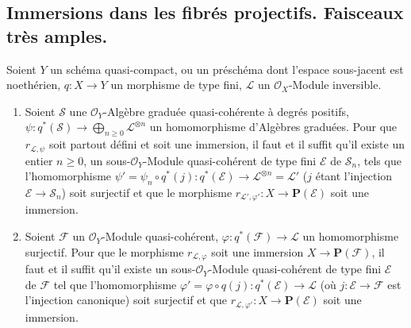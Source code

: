 \subsection{Immersions dans les fibrés projectifs. Faisceaux très amples.}
\label{subsection:II.4.4-fr}

\begin{proposition}[4.4.1]
\label{II.4.4.1-fr}
Soient $Y$ un schéma quasi-compact, ou un préschéma dont l'espace sous-jacent
est noethérien, $q:X\to Y$ un morphisme \textup{de type fini}, $\mathcal{L}$ un
$\mathcal{O}_X$-Module inversible.
\begin{enumerate}
  \item[\rm{(i)}] Soient $\mathcal{S}$ une $\mathcal{O}_Y$-Algèbre graduée
  quasi-cohérente à degrés positifs,
  $\psi:q^*(\mathcal{S})\to\bigoplus_{n\geq0}\mathcal{L}^{\otimes n}$ un
  homomorphisme d'Algèbres graduées. Pour que $r_{\mathcal{L},\psi}$ soit
  partout défini et soit une immersion, il faut et
  il suffit qu'il existe un entier $n\geq0$, un sous-$\mathcal{O}_Y$-Module
  quasi-cohérent \textup{de type fini} $\mathcal{E}$ de $\mathcal{S}_n$, tels que
  l'homomorphisme
  $\psi'=\psi_n\circ q^*(j):q^*(\mathcal{E})
  \to\mathcal{L}^{\otimes n}=\mathcal{L}'$
  ($j$ étant l'injection $\mathcal{E}\to\mathcal{S}_n$) soit surjectif et que
  le morphisme
  $r_{\mathcal{L}',\varphi'}:X\to\mathbf{P}(\mathcal{E})$ soit une immersion.
  \item[\rm{(ii)}] Soient $\mathcal{F}$ un $\mathcal{O}_Y$-Module
  quasi-cohérent, $\varphi:q^*(\mathcal{F})\to\mathcal{L}$ un homomorphisme
  surjectif. Pour que le morphisme $r_{\mathcal{L},\varphi}$ soit une
  immersion $X\to\mathbf{P}(\mathcal{F})$, il faut et il suffit qu'il existe
  un sous-$\mathcal{O}_Y$-Module quasi-cohérent \textup{de type fini} $\mathcal{E}$ de
  $\mathcal{F}$ tel que l'homomorphisme
  $\varphi'=\varphi\circ q(j):q^*(\mathcal{E})\to\mathcal{L}$ (où
  $j:\mathcal{E}\to\mathcal{F}$ est l'injection canonique) soit surjectif et
  que $r_{\mathcal{L},\varphi'}:X\to\mathbf{P}(\mathcal{E})$ soit une
  immersion.
\end{enumerate}
\end{proposition}

